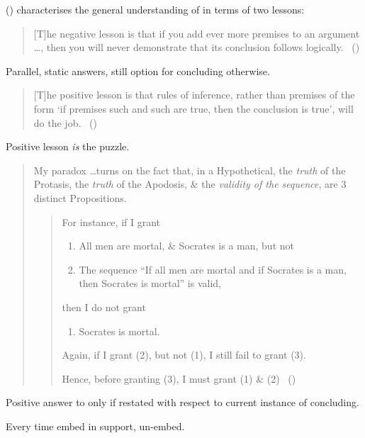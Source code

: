 \begin{note}
{    \citeauthor{Wieland:2013vf} (\citeyear{Wieland:2013vf}) characterises the general understanding of \textcite{Carroll:1895uj} in terms of two lessons:
  \begin{quote}
    [T]he negative lesson is that if you add ever more premises to an argument \dots, then you will never demonstrate that its conclusion follows logically.\newline
    \mbox{ }\hfill\mbox{(\citeyear[984]{Wieland:2013vf})}
  \end{quote}

  Parallel, static answers, still option for concluding otherwise.

  \begin{quote}
    [T]he positive lesson is that rules of inference, rather than premises of the form `if premises such and such are true, then the conclusion is true', will do the job.\newline
    \mbox{ }\hfill\mbox{(\citeyear[984]{Wieland:2013vf})}
  \end{quote}
  Positive lesson \emph{is} the puzzle.
}

\begin{quote}
  My paradox \dots turns on the fact that, in a Hypothetical, the \emph{truth} of the Protasis, the \emph{truth} of the Apodosis, \& the \emph{validity of the sequence}, are 3 distinct Propositions.
  \begin{quote}
    For instance, if I grant

    \begin{enumerate}[label=(\arabic*)]
    \item
      All men are mortal, \& Socrates is a man, but not
    \item
      The sequence “If all men are mortal and if Socrates is a man, then Socrates is mortal” is valid,
    \end{enumerate}

    then I do not grant

    \begin{enumerate}[label=(\arabic*), resume]
    \item Socrates is mortal.
    \end{enumerate}
    Again, if I grant (2), but not (1), I still fail to grant (3).

    Hence, before granting (3), I must grant (1) \& (2)\newline
    \mbox{ }\hfill\mbox{(\citeyear[10--11]{Carroll:2016wl})}
  \end{quote}
\end{quote}

  \begin{generator}[\requ{3}]
    Positive answer to only if \requ{} restated with respect to current instance of concluding.
  \end{generator}

  Every time embed in support, un-embed.
\end{note}

